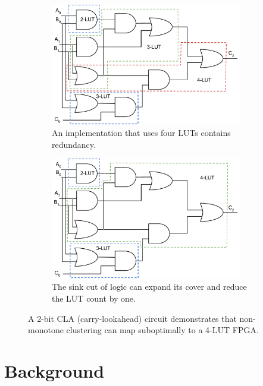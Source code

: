 \begin{figure}[tb]
    \begin{subfigure}{0.49\textwidth}
        \centering
        \includegraphics[width=0.92\textwidth]{img/cla_bad.pdf}
        \caption{An implementation that uses four LUTs contains redundancy.}\label{fig:eg:bad}
    \end{subfigure}
    \hfill
    \begin{subfigure}{0.49\textwidth}
        \centering
        \includegraphics[width=0.92\textwidth]{img/cla_good.pdf}
        \caption{The sink cut of logic can expand its cover and reduce the LUT count by one.}\label{fig:eg:good}
    \end{subfigure}
    \caption{A 2-bit CLA (carry-lookahead) circuit demonstrates that non-monotone clustering can map suboptimally to a 4-LUT FPGA.}\label{fig:eg}
\end{figure}

\section{Background}\label{sec:background}

